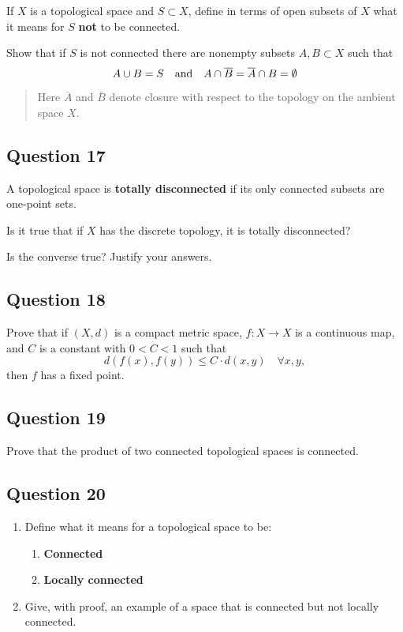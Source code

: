 \documentclass[12pt]{article}
\begin{document}
If \(X\) is a topological space and \(S \subset X\), define in terms of
open subsets of \(X\) what it means for \(S\) \textbf{not} to be
connected.

Show that if \(S\) is not connected there are nonempty subsets
\(A, B \subset X\) such that \[
A \cup B = S {\quad \operatorname{and} \quad} A \cap \overline{B} = \overline{A} \cap B = \emptyset
\]

\begin{quote}
Here \(\bar A\) and \(\bar B\) denote closure with respect to the
topology on the ambient space \(X\).
\end{quote}

\hypertarget{question-17-3}{%
\subsection{Question 17}\label{question-17-3}}

A topological space is \textbf{totally disconnected} if its only
connected subsets are one-point sets.

Is it true that if \(X\) has the discrete topology, it is totally
disconnected?

Is the converse true? Justify your answers.

\hypertarget{question-18-3}{%
\subsection{Question 18}\label{question-18-3}}

Prove that if \((X, d)\) is a compact metric space, \(f : X \to X\) is a
continuous map, and \(C\) is a constant with \(0 < C < 1\) such that \[
d(f (x), f (y)) \leq C \cdot d(x, y) \quad \forall x, y
,\] then \(f\) has a fixed point.

\hypertarget{question-19-3}{%
\subsection{Question 19}\label{question-19-3}}

Prove that the product of two connected topological spaces is connected.

\hypertarget{question-20-3}{%
\subsection{Question 20}\label{question-20-3}}

\begin{enumerate}
\def\labelenumi{\alph{enumi}.}
\item
  Define what it means for a topological space to be:

  \begin{enumerate}
  \def\labelenumii{\roman{enumii}.}
  \item
    \textbf{Connected}
  \item
    \textbf{Locally connected}
  \end{enumerate}
\item
  Give, with proof, an example of a space that is connected but not
  locally connected.
\end{enumerate}
\end{document}
